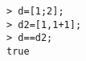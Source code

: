 \begin{center}\begin{minipage}{15cm}\begin{Verbatim}[frame=single]
> d=[1;2];
> d2=[1,1+1];
> d==d2;
true
\end{Verbatim}
\end{minipage}\end{center}
